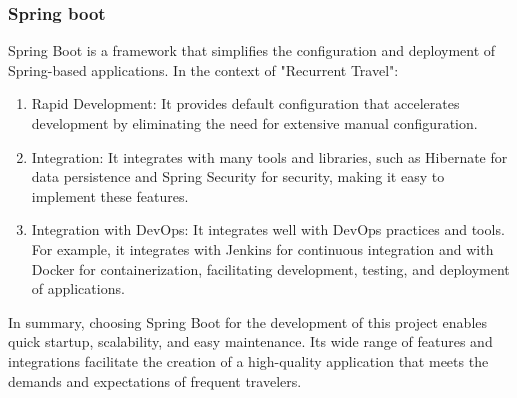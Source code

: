 \documentclass[../memory.tex]{subfiles}
\begin{document}
\subsubsection{Spring boot}
Spring Boot is a framework that simplifies the configuration and deployment of Spring-based applications. In the context of "Recurrent Travel":
\begin{enumerate}[label = -]
	\item Rapid Development: It provides default configuration that accelerates
	      development by eliminating the need for extensive manual configuration.
	\item Integration: It integrates with many tools and libraries, such as
	      Hibernate for data persistence and Spring Security for security, making it
	      easy to implement these features.
	\item Integration with DevOps: It integrates well with DevOps practices and
	      tools. For example, it integrates with Jenkins for continuous integration
	      and with Docker for containerization, facilitating development, testing, and
	      deployment of applications.
\end{enumerate}
In summary, choosing Spring Boot for the development of this project enables
quick startup, scalability, and easy maintenance. Its wide range of features and
integrations facilitate the creation of a high-quality application that meets
the demands and expectations of frequent travelers.
\end{document}
